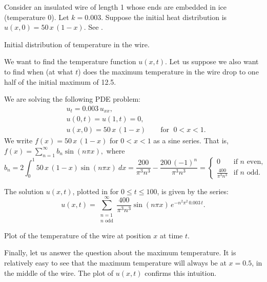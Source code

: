 \begin{example}
Consider
an insulated wire of length 1 whose
ends are embedded in ice (temperature 0).
Let $k=0.003$.  Suppose the initial heat distribution
is $u(x,0) = 50\,x\,(1-x)$.
See .

\begin{myfig}
\capstart
{}
\caption{Initial distribution of temperature in the
wire.\label{heat:wireexinitfig}}
\end{myfig}

We want to find the temperature function $u(x,t)$.  Let us suppose we also
want to find when (at what $t$) does the maximum temperature in the wire 
drop to one half of the initial maximum of 12.5.

We are solving the following PDE problem:
\begin{align*}
& u_t = 0.003 \, u_{xx} , \\
& u(0,t) = u(1,t) = 0 , \\
& u(x,0) = 50\,x\,(1-x) \qquad \text{for } \; 0 < x < 1 .
\end{align*}
We write $f(x) = 50\,x\,(1-x)$ for $0 < x < 1$ as a sine series.  That is,
$
f(x) = \sum_{n=1}^\infty b_n \sin (n \pi x) ,
$
where
\begin{equation*}
b_n = 2 \int_0^1 50\,x\,(1-x) \sin (n \pi x) ~dx
= 
\frac{200}{{\pi }^{3}{n}^{3}}-\frac{200\,{\left( -1\right) }^{n}}{{\pi }^{3}{n}^{3}}
=
\begin{cases}
0 & \text{if } n \text{ even} , \\
\frac{400}{\pi^3 n^3} & \text{if } n \text{ odd} .
\end{cases}
\end{equation*}

The solution $u(x,t)$, plotted in
 for $0 \leq t \leq 100$,
is given by the series:
\begin{equation*}
u(x,t) = 
\sum_{\substack{n=1 \\ n \text{ odd}}}^\infty
\frac{400}{\pi^3 n^3}
\sin (n \pi x )
\, e^{-n^2 \pi^2 \, 0.003 \, t} .
\end{equation*}

\begin{myfig}
\capstart
{}
\caption{Plot of the temperature of the wire at position $x$
at time $t$.\label{heat:wireexfig}}
\end{myfig}

Finally, let us answer the question about the maximum temperature.  It is
relatively easy to see
that the maximum temperature will always be at $x=0.5$, in
the middle of the wire.  The plot of $u(x,t)$ confirms this intuition.


\end{example}
